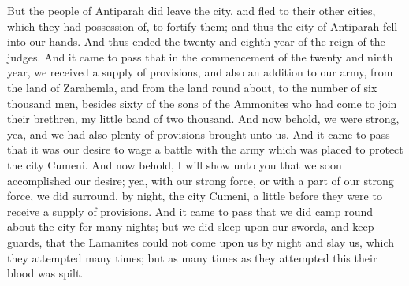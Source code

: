 But the people of Antiparah did leave the city, and fled to their other cities, which they had possession of, to fortify them; and thus the city of Antiparah fell into our hands.
\bverse \iffalse And thus ended the twenty and eighth year of the reign of the judges. \fi
And thus ended the twenty and eighth year of the reign of the judges.
\bverse \iffalse And it came to pass that in the commencement of the twenty and ninth year, we received a supply of provisions, and also an addition to our army, from the land of Zarahemla, and from the land round about, to the number of six thousand men, besides sixty of the sons of the Ammonites who had come to join their brethren, my little band of two thousand. And now behold, we were strong, yea, and we had also plenty of provisions brought unto us. \fi
And it came to pass that in the commencement of the twenty and ninth year, we received a supply of provisions, and also an addition to our army, from the land of Zarahemla, and from the land round about, to the number of six thousand men, besides sixty of the sons of the Ammonites who had come to join their brethren, my little band of two thousand. And now behold, we were strong, yea, and we had also plenty of provisions brought unto us.
\bverse \iffalse And it came to pass that it was our desire to wage a battle with the army which was placed to protect the city Cumeni. \fi
And it came to pass that it was our desire to wage a battle with the army which was placed to protect the city Cumeni.
\bverse \iffalse And now behold, I will show unto you that we soon accomplished our desire; yea, with our strong force, or with a part of our strong force, we did surround, by night, the city Cumeni, a little before they were to receive a supply of provisions. \fi
And now behold, I will show unto you that we soon accomplished our desire; yea, with our strong force, or with a part of our strong force, we did surround, by night, the city Cumeni, a little before they were to receive a supply of provisions.
\bverse \iffalse And it came to pass that we did camp round about the city for many nights; but we did sleep upon our swords, and keep guards, that the Lamanites could not come upon us by night and slay us, which they attempted many times; but as many times as they attempted this their blood was spilt. \fi
And it came to pass that we did camp round about the city for many nights; but we did sleep upon our swords, and keep guards, that the Lamanites could not come upon us by night and slay us, which they attempted many times; but as many times as they attempted this their blood was spilt.
